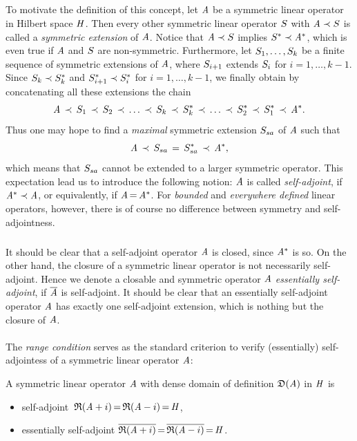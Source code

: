 \documentclass[11pt,twoside]{article}
\begin{document}
\subparagraph*{}
To motivate the definition of this concept,
let $\mathit{A}$ be a symmetric linear operator in Hilbert space $\mathit{H}$.
Then every other symmetric linear operator ${S}$ with $\mathit{A} \prec {S}$
is called a \textit{symmetric extension} of $\mathit{A}$.
Notice 
that $\mathit{A} \prec {S}$ implies ${S}^* \prec \mathit{A}^*$,
which is even true if $\mathit{A}$ and ${S}$ are non-symmetric.
Furthermore,
let ${S}_1,\ldots,{S}_k$ be a finite sequence
of symmetric extensions of $\mathit{A}$,
where ${S}_{i+1}$ extends ${S}_i$ for $i=1,\ldots,k-1$.
Since ${S}_k \prec {S}_k^*$ and
${S}_{i+1}^* \prec {S}_i^*$ for $i=1,\ldots,k-1$,
we finally obtain by concatenating all these extensions the chain
\[
\mathit{A} \, \prec \, {S}_1
\, \prec \,
{S}_2
\, \prec \,
\ldots
\, \prec \,
{S}_k
\, \prec \,
{S}_k^*
\, \prec \,
\ldots
\, \prec \,
{S}_2^*
\, \prec \,
{S}_1^*
\, \prec \,
\mathit{A}^*.
\]
Thus one may hope to find a \textit{maximal} symmetric extension
${S}_{sa}$ of $\mathit{A}$ such that
\[
\mathit{A} \, \prec \, {S}_{sa} \,=\, {S}_{sa}^* \, \prec \, \mathit{A}^*,
\]
which means that
${S}_{sa}$ cannot be extended to a larger symmetric operator.
This expectation lead us to introduce the following notion:
$\mathit{A}$ is called \textit{self-adjoint},
if $\mathit{A}^* \prec \mathit{A}$,
or equivalently,
if $\mathit{A} {\,=\,} \mathit{A}^*$.
For \textit{bounded} and \textit{everywhere defined} linear operators,
however,
there is of course no difference between symmetry and self-adjointness.

\subparagraph*{}
It should be clear that a self-adjoint operator $\mathit{A}$ is closed, 
since $\mathit{A}^*$ is so.
On the other hand,
the closure of a symmetric linear operator is not necessarily self-adjoint.
Hence we denote a closable and symmetric operator $\mathit{A}$
\textit{essentially self-adjoint},
if $\overline{\mathit{A}}$ is self-adjoint.
It should be clear
that an essentially self-adjoint operator $\mathit{A}$ has exactly
one self-adjoint extension,
which is nothing but the closure of $\mathit{A}$.

\paragraph*{}
The \textit{range condition} serves as the standard criterion to verify
(essentially) self-adjointess of a symmetric linear operator $\mathit{A}$:

\begin{theorem}\label{RANGE_CONDITION}
A symmetric linear operator $\mathit{A}$
with dense domain of definition $\mathfrak{D}(\mathit{A})$ in $\mathit{H}$ is

\begin{itemize}[leftmargin=12pt,itemsep=5pt]
\item[1.]
self-adjoint \iff
$\,\mathfrak{R}(\mathit{A} + i) {\,=\,} \mathfrak{R}(\mathit{A} - i) {\,=\,} \mathit{H}$,
\item[2.]
essentially self-adjoint \iff
$\overline{ \mathfrak{R}(\mathit{A} + i) } {\,=\,} \overline{ \mathfrak{R}(\mathit{A} - i) } {\,=\,} \mathit{H}$.
\end{itemize}
\end{theorem}
\end{document}
